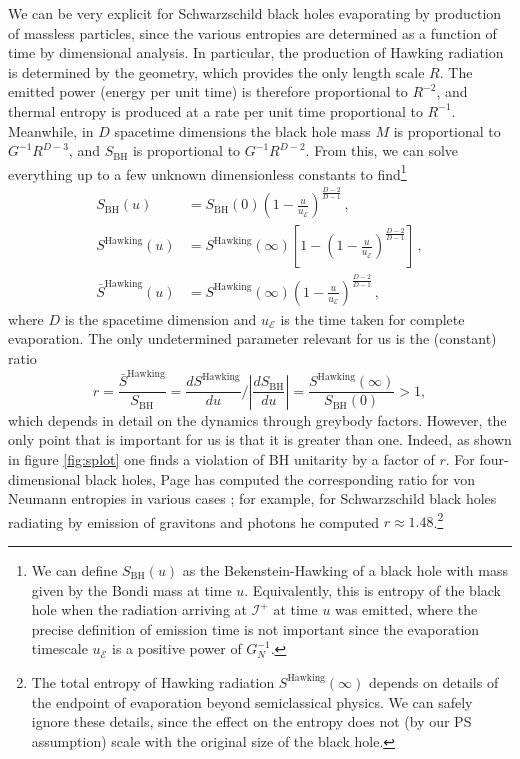 \documentclass[letterpaper,12pt]{article}
\newcommand*{\scri}{\mathscr{I}} %
\newcommand*{\evap}{\mathscr{E}} %
\begin{document}
We can be very explicit for Schwarzschild black holes evaporating by production of massless particles, since the various entropies are determined as a function of time by dimensional analysis. In particular, the production of Hawking radiation is determined by the geometry, which provides the only length scale $R$. The emitted power (energy per unit time) is therefore proportional to $R^{-2}$, and thermal entropy is produced at a rate per unit time proportional to $R^{-1}$. Meanwhile, in $D$ spacetime dimensions the black hole mass $M$ is proportional to $G^{-1}R^{D-3}$, and $S_\text{BH}$ is proportional to $G^{-1}R^{D-2}$. From this, we can solve everything up to a few unknown dimensionless constants to find\footnote{We can define $S_\mathrm{BH}(u)$ as the Bekenstein-Hawking of a black hole with mass given by the Bondi mass at time $u$. Equivalently, this is entropy of the black hole when the radiation arriving at $\scri^+$ at time $u$ was emitted, where the precise definition of emission time is not important since the evaporation timescale $u_\evap$ is a positive power of $G_N^{-1}$.}
\begin{align*}
	S_\text{BH}(u) &= S_\text{BH}(0) \left(1-\frac{u}{u_\evap}\right)^\frac{D-2}{D-1}\,, \\
	S^\text{Hawking}(u) &= S^\text{Hawking}(\infty)\left[1- \left(1-\frac{u}{u_\evap}\right)^\frac{D-2}{D-1}\right]\,, \\
	\bar S^\text{Hawking}(u) &= S^\text{Hawking}(\infty)\left(1-\frac{u}{u_\evap}\right)^\frac{D-2}{D-1}\,,
\end{align*}
where $D$ is the spacetime dimension and $u_\evap$ is the time taken for complete evaporation.  The only undetermined parameter relevant for us is the (constant) ratio
\begin{equation}
	r = \frac{\bar S^\text{Hawking}}{S_\text{BH}} =  \frac{d S^\text{Hawking}}{du}\Big/ \left|\frac{d S_\text{BH}}{du}\right| =  \frac{S^\text{Hawking}(\infty)}{S_\text{BH}(0)} >1,
\end{equation}
which depends in detail on the dynamics through greybody factors. However, the only point that is important for us is that it is greater than one.  Indeed, as shown in figure \ref{fig:splot} one finds a violation of BH unitarity by a factor of $r$.  For four-dimensional black holes, Page has computed the corresponding ratio for von Neumann entropies in various cases \cite{Page:1976df,Page:2013dx}; for example, for Schwarzschild black holes radiating by emission of gravitons and photons he computed $r\approx 1.48$.\footnote{The total entropy of Hawking radiation $S^\text{Hawking}(\infty)$ depends on details of the endpoint of evaporation beyond semiclassical physics. We can safely ignore these details, since the effect on the entropy does not (by our PS assumption) scale with the original size of the black hole.}
\end{document}
